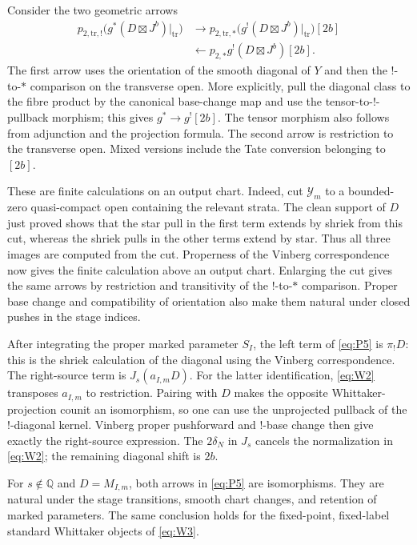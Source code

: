 Consider the two geometric arrows
\begin{equation}\label{eq:P5}
\begin{split}
 p_{2,\mathrm{tr},!}
       \bigl(g^*(D\boxtimes J^b)|_{\mathrm{tr}}\bigr)
 &\longrightarrow
 p_{2,\mathrm{tr},*}
       \bigl(g^!(D\boxtimes J^b)|_{\mathrm{tr}}\bigr)[2b]
 \\[-2pt]
 &\longleftarrow
 p_{2,*}g^!(D\boxtimes J^b)[2b].
\end{split}
\end{equation}
The first arrow uses the orientation of the smooth diagonal
of $Y$ and then the $!$-to-$*$ comparison on the transverse
open.  More explicitly, pull the diagonal class to the
fibre product by the canonical base-change map and use the
tensor-to-$!$-pullback morphism; this gives
$g^*\to g^![2b]$.  The tensor morphism also follows from
adjunction and the projection formula.  The second arrow
is restriction to the transverse open.  Mixed versions
include the Tate conversion belonging to $[2b]$.

These are finite calculations on an output chart.  Indeed,
cut $\mathcal Y_m$ to a bounded-zero quasi-compact open
containing the relevant strata.  The clean support of $D$
just proved shows that the star pull in the first term
extends by shriek from this cut, whereas the shriek pulls
in the other terms extend by star.  Thus all three images
are computed from the cut.  Properness of the Vinberg
correspondence now gives the finite calculation above an
output chart.  Enlarging the cut gives the same arrows by
restriction and transitivity of the $!$-to-$*$ comparison.
Proper base change and compatibility of orientation also
make them natural under closed pushes in the stage indices.

After integrating the proper marked parameter $S_I$, the
left term of \eqref{eq:P5} is $\pi_!D$: this is the
shriek calculation of the diagonal using the Vinberg
correspondence.  The right-source term is $J_s(a_{I,m}D)$.
For the latter identification, \eqref{eq:W2} transposes
$a_{I,m}$ to restriction.  Pairing with $D$ makes the
opposite Whittaker-projection counit an isomorphism, so
one can use the unprojected pullback of the $!$-diagonal
kernel.  Vinberg proper pushforward and $!$-base change
then give exactly the right-source expression.  The
$2\delta_N$ in $J_s$ cancels the normalization in
\eqref{eq:W2}; the remaining diagonal shift is $2b$.

\begin{proposition}\label{deform:vinberg}
For $s\notin\mathbb Q$ and $D=M_{I,m}$, both arrows in
\eqref{eq:P5} are isomorphisms.  They are natural under the
stage transitions, smooth chart changes, and retention of
marked parameters.  The same conclusion holds for the
fixed-point, fixed-label standard Whittaker objects of
\eqref{eq:W3}.
\end{proposition}

